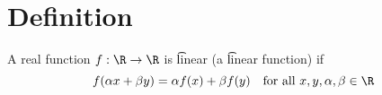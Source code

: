
\section*{Definition}

A real function $f: \R  \to \R $ is \t{linear} (a \t{linear function}) if
\[
f(\alpha x + \beta y) = \alpha f(x) + \beta f(y) \quad \text{for all } x, y, \alpha , \beta  \in \R
\]

\blankpage